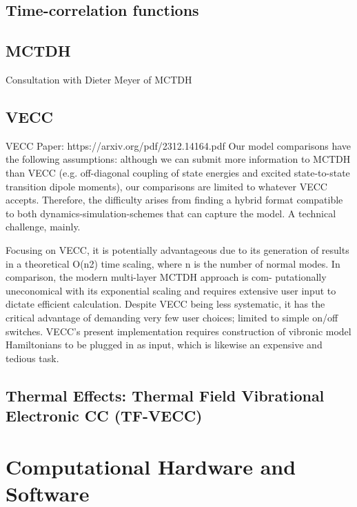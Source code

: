     \subsection{Time-correlation functions}
    
    \subsection{MCTDH}
    Consultation with Dieter Meyer of MCTDH
    
    \subsection{VECC}
    VECC Paper: https://arxiv.org/pdf/2312.14164.pdf
    Our model comparisons have the following assumptions: although we can submit more information to MCTDH than VECC (e.g. off-diagonal coupling of state energies and excited state-to-state transition dipole moments), our comparisons are limited to whatever VECC accepts. Therefore, the difficulty arises from finding a hybrid format compatible to both dynamics-simulation-schemes that can capture the model. A technical challenge, mainly.

    Focusing on VECC, it is potentially advantageous due to its generation of results in a theoretical O(n2) time scaling, where
n is the number of normal modes. In comparison, the modern multi-layer MCTDH approach is com-
putationally uneconomical with its exponential scaling and requires extensive user input to dictate
efficient calculation. Despite VECC being less systematic, it has the critical advantage of demanding
very few user choices; limited to simple on/off switches. VECC’s present implementation requires
construction of vibronic model Hamiltonians to be plugged in as input, which is likewise an expensive
and tedious task.

    \subsection{Thermal Effects: Thermal Field Vibrational Electronic CC (TF-VECC)}


\section{Computational Hardware and Software}

